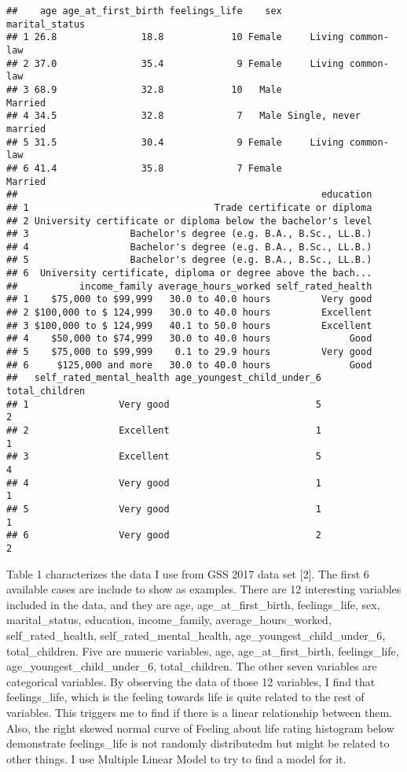 \documentclass[
]{article}
\begin{document}
\begin{verbatim}
##    age age_at_first_birth feelings_life    sex        marital_status
## 1 26.8               18.8            10 Female     Living common-law
## 2 37.0               35.4             9 Female     Living common-law
## 3 68.9               32.8            10   Male               Married
## 4 34.5               32.8             7   Male Single, never married
## 5 31.5               30.4             9 Female     Living common-law
## 6 41.4               35.8             7 Female               Married
##                                                      education
## 1                                 Trade certificate or diploma
## 2 University certificate or diploma below the bachelor's level
## 3                  Bachelor's degree (e.g. B.A., B.Sc., LL.B.)
## 4                  Bachelor's degree (e.g. B.A., B.Sc., LL.B.)
## 5                  Bachelor's degree (e.g. B.A., B.Sc., LL.B.)
## 6  University certificate, diploma or degree above the bach...
##           income_family average_hours_worked self_rated_health
## 1    $75,000 to $99,999   30.0 to 40.0 hours         Very good
## 2 $100,000 to $ 124,999   30.0 to 40.0 hours         Excellent
## 3 $100,000 to $ 124,999   40.1 to 50.0 hours         Excellent
## 4    $50,000 to $74,999   30.0 to 40.0 hours              Good
## 5    $75,000 to $99,999    0.1 to 29.9 hours         Very good
## 6     $125,000 and more   30.0 to 40.0 hours              Good
##   self_rated_mental_health age_youngest_child_under_6 total_children
## 1                Very good                          5              2
## 2                Excellent                          1              1
## 3                Excellent                          5              4
## 4                Very good                          1              1
## 5                Very good                          1              1
## 6                Very good                          2              2
\end{verbatim}

Table 1 characterizes the data I use from GSS 2017 data set {[}2{]}. The
first 6 available cases are include to show as examples. There are 12
interesting variables included in the data, and they are age,
age\_at\_first\_birth, feelings\_life, sex, marital\_status, education,
income\_family, average\_hours\_worked, self\_rated\_health,
self\_rated\_mental\_health, age\_youngest\_child\_under\_6,
total\_children. Five are numeric variables, age, age\_at\_first\_birth,
feelings\_life, age\_youngest\_child\_under\_6, total\_children. The
other seven variables are categorical variables. By observing the data
of those 12 variables, I find that feelings\_life, which is the feeling
towards life is quite related to the rest of variables. This triggers me
to find if there is a linear relationship between them. Also, the right
skewed normal curve of Feeling about life rating histogram below
demonstrate feelings\_life is not randomly distributedm but might be
related to other things. I use Multiple Linear Model to try to find a
model for it.\\
\end{document}
